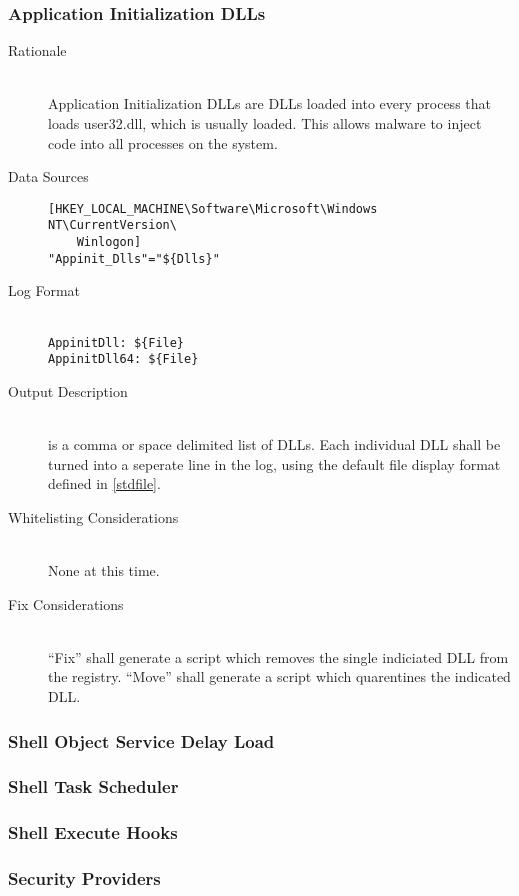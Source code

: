 \subsubsection{Application Initialization DLLs}
\begin{description}
\item[Rationale] \hfill \\
Application Initialization DLLs are DLLs loaded into every process that loads
user32.dll, which is usually loaded. This allows malware to inject code into all
processes on the system.
\item[Data Sources] \hfill
\vspace{-\baselineskip}
\begin{verbatim}
[HKEY_LOCAL_MACHINE\Software\Microsoft\Windows NT\CurrentVersion\
    Winlogon]
"Appinit_Dlls"="${Dlls}"
\end{verbatim}
\item[Log Format] \hfill \\
\verb|AppinitDll: ${File}| \\
\verb|AppinitDll64: ${File}|
\item[Output Description] \hfill \\
 is a comma or space delimited list of DLLs. Each individual DLL shall
be turned into a seperate line in the log, using the default file display format
defined in \ref{stdfile}.
\item[Whitelisting Considerations] \hfill \\
None at this time.
\item[Fix Considerations] \hfill \\
``Fix'' shall generate a script which removes the single indiciated DLL from the
registry. ``Move'' shall generate a script which quarentines the indicated DLL.
\end{description}

\subsubsection{Shell Object Service Delay Load}
\subsubsection{Shell Task Scheduler}
\subsubsection{Shell Execute Hooks}
\subsubsection{Security Providers}
